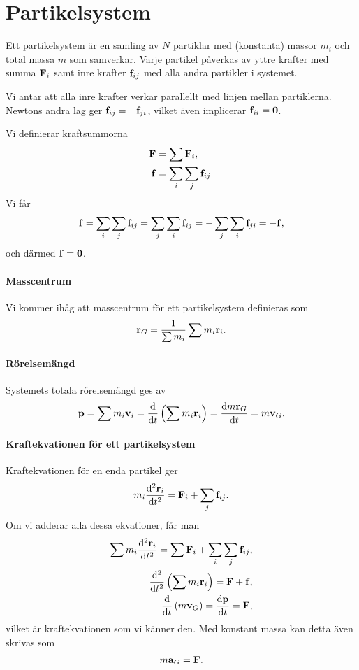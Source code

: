 \section{Partikelsystem}
Ett partikelsystem är en samling av $N$ partiklar med (konstanta) massor $m_i$ och total massa $m$ som samverkar. Varje partikel påverkas av yttre krafter med summa $\vb{F}_{i}$ samt inre krafter $\vb{f}_{ij}$ med alla andra partikler i systemet.

Vi antar att alla inre krafter verkar parallellt med linjen mellan partiklerna. Newtons andra lag ger $\vb{f}_{ij} = -\vb{f}_{ji}$, vilket även implicerar $\vb{f}_{ii}= \vb{0}$.

Vi definierar kraftsummorna
\begin{align*}
	\vb{F}     &= \sum \vb{F}_{i}, \\
	\vb{f}     &= \sum\limits_{i}\sum\limits_{j}\vb{f}_{ij}.
\end{align*}
Vi får
\begin{align*}
	\vb{f} = \sum\limits_{i}\sum\limits_{j}\vb{f}_{ij} = \sum\limits_{j}\sum\limits_{i}\vb{f}_{ij} = -\sum\limits_{j}\sum\limits_{i}\vb{f}_{ji} = -\vb{f},
\end{align*}
och därmed $\vb{f} = \vb{0}$.

\paragraph{Masscentrum}
Vi kommer ihåg att masscentrum för ett partikelsystem definieras som
\begin{align*}
	\vb{r}_{G} = \frac{1}{\sum m_i}\sum m_i\vb{r}_i.
\end{align*}

\paragraph{Rörelsemängd}
Systemets totala rörelsemängd ges av
\begin{align*}
	\vb{p} = \sum m_i\vb{v}_{i} = \dv{t}\left(\sum m_i\vb{r}_{i}\right) = \dv{m\vb{r}_{G}}{t} = m\vb{v}_{G}.
\end{align*}

\paragraph{Kraftekvationen för ett partikelsystem}
Kraftekvationen för en enda partikel ger
\begin{align*}
	m_{i}\dv[2]{\vb{r}_{i}}{t} = \vb{F}_{i} + \sum\limits_{j}\vb{f}_{ij}.
\end{align*}
Om vi adderar alla dessa ekvationer, får man
\begin{align*}
	\sum m_{i}\dv[2]{\vb{r}_{i}}{t} = \sum \vb{F}_{i} + \sum\limits_{i}\sum\limits_{j}\vb{f}_{ij}, \\
	\dv[2]{t}\left(\sum m_{i}\vb{r}_{i}\right) = \vb{F} + \vb{f}, \\
	\dv{t}\left(m\vb{v}_{G}\right) = \dv{\vb{p}}{t} = \vb{F},
\end{align*}
vilket är kraftekvationen som vi känner den. Med konstant massa kan detta även skrivas som
\begin{align*}
	m\vb{a}_{G} = \vb{F}.
\end{align*}